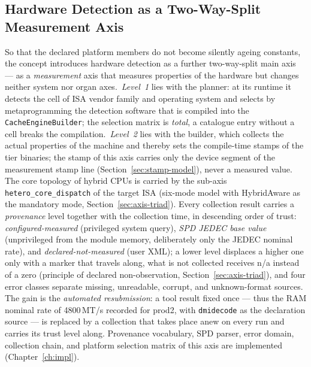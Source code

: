 \begin{nurkurz}
\subsection{Hardware Detection as a Two-Way-Split Measurement Axis}\label{sec:hw-probe}
So that the declared platform members do not become silently ageing constants, the concept introduces
hardware detection as a further two-way-split main axis --- as a \emph{measurement} axis that measures
properties of the hardware but changes neither system nor organ axes.\ \emph{Level~1} lies with the
planner: at its runtime it detects the cell of ISA vendor family and operating system and selects by
metaprogramming the detection software that is compiled into the \texttt{CacheEngineBuilder}; the
selection matrix is \emph{total}, a catalogue entry without a cell breaks the compilation.\
\emph{Level~2} lies with the builder, which collects the actual properties of the machine and thereby
sets the compile-time stamps of the tier binaries; the stamp of this axis carries only the device
segment of the measurement stamp line (Section~\ref{sec:stamp-model}), never a measured value. The core
topology of hybrid CPUs is carried by the sub-axis \texttt{hetero\_core\_dispatch} of the target ISA
(six-mode model with HybridAware as the mandatory mode, Section~\ref{sec:axis-triad}). Every collection
result carries a \emph{provenance} level together with the collection time, in descending order of
trust: \emph{configured-measured} (privileged system query), \emph{SPD JEDEC base value}
(unprivileged from the module memory, deliberately only the JEDEC nominal rate), and
\emph{declared-not-measured} (user XML); a lower level displaces a higher one only with a marker that
travels along, what is not collected receives n/a instead of a zero (principle of declared
non-observation, Section~\ref{sec:axis-triad}), and four error classes separate missing, unreadable,
corrupt, and unknown-format sources. The gain is the \emph{automated resubmission}: a tool result fixed
once --- thus the RAM nominal rate of 4800\,MT/s recorded for prod2, with \texttt{dmidecode} as the
declaration source --- is replaced by a collection that takes place anew on every run and carries its
trust level along. Provenance vocabulary, SPD parser, error domain, collection chain, and platform
selection matrix of this axis are implemented (Chapter~\ref{ch:impl}).

\end{nurkurz}
